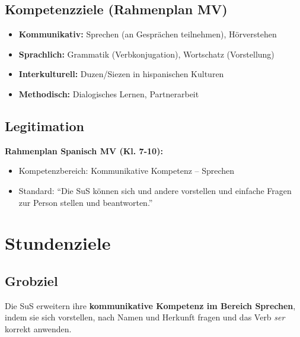 \documentclass[11pt,a4paper]{article}
\begin{document}
\subsection{Kompetenzziele (Rahmenplan MV)}
\begin{itemize}
    \item \textbf{Kommunikativ:} Sprechen (an Gesprächen teilnehmen), Hörverstehen
    \item \textbf{Sprachlich:} Grammatik (Verbkonjugation), Wortschatz (Vorstellung)
    \item \textbf{Interkulturell:} Duzen/Siezen in hispanischen Kulturen
    \item \textbf{Methodisch:} Dialogisches Lernen, Partnerarbeit
\end{itemize}

\subsection{Legitimation}
\textbf{Rahmenplan Spanisch MV (Kl. 7-10):}
\begin{itemize}
    \item Kompetenzbereich: Kommunikative Kompetenz -- Sprechen
    \item Standard: ``Die SuS können sich und andere vorstellen und einfache Fragen zur Person stellen und beantworten.''
\end{itemize}

\section{Stundenziele}

\subsection{Grobziel}
Die SuS erweitern ihre \textbf{kommunikative Kompetenz im Bereich Sprechen}, indem sie sich vorstellen, nach Namen und Herkunft fragen und das Verb \textit{ser} korrekt anwenden.
\end{document}

